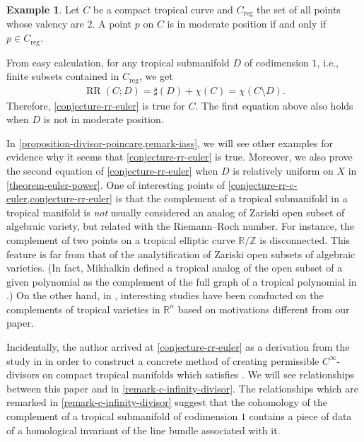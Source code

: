 \documentclass[a4paper,dvipdfmx,reqno,12pt]{amsart}
\theoremstyle{definition}
\newtheorem{example}[theorem]{Example}
\newcommand{\opn}[1]{\operatorname{#1}}
\numberwithin{equation}{section}
\begin{document}
\begin{example}
\label{example-permissible-point}
Let $C$ be a compact tropical curve 
and $C_{\mathrm{reg}}$ the set of all
points whose valency are $2$.
A point $p$ on $C$ is in moderate position
if and only if $p\in C_{\mathrm{reg}}$.

From easy calculation, for any 
tropical submanifold $D$ of codimension $1$, i.e.,
finite subsets contained in $C_{\mathrm{reg}}$, we get
\begin{align}
\opn{RR}(C;D)=\sharp (D)+ \chi(C)
=\chi(C\setminus D).
\end{align}
Therefore, \cref{conjecture-rr-euler} is true
for $C$. The first equation above also holds when
$D$ is not in moderate position.
\end{example}
In \cref{proposition-divisor-poincare,remark-iass},
we will see other examples for evidence 
why it seems that \cref{conjecture-rr-euler}
is true. Moreover, we also prove
the second equation of 
\cref{conjecture-rr-euler} when $D$ is 
relatively uniform on $X$ in
\cref{theorem-euler-power}.
One of interesting points of
\cref{conjecture-rr-c-euler,conjecture-rr-euler} is that
the complement of a tropical submanifold in
a tropical manifold is \emph{not} usually
considered an analog of Zariski open subset
of algebraic variety, but related with the
Riemann--Roch number.
For instance, the complement of two points 
on a tropical elliptic curve
$\mathbb{R}/\mathbb{Z}$ is disconnected.
This feature is far from that of the analytification of Zariski open subsets of
algebraic varieties.
(In fact, Mikhalkin defined
a tropical analog of the open subset of
a given polynomial as the complement of
the full graph \cite[]{MR2275625}
of a tropical polynomial in
\cite[Remark 3.5 and Example 3.6]{MR2275625}.)
On the other hand, in \cite{MR3498901,MR3968872}, 
interesting studies have been conducted on
the complements of tropical varieties in
$\mathbb{R}^n$ based on motivations
different from our paper.

Incidentally, the author arrived at
\cref{conjecture-rr-euler} as
a derivation from the study in
\cite{tsutsui2023graded} in order to
construct a concrete method of creating
permissible $C^{\infty}$-divisors on
compact tropical manifolds which
satisfies \cite[Conjecture 1.2]{tsutsui2023graded}. 
We will see relationships between 
this paper and \cite{tsutsui2023graded}
in \cref{remark-c-infinity-divisor}.
The relationships which are
remarked in \cref{remark-c-infinity-divisor}
suggest that the cohomology of the complement
of a tropical submanifold of codimension $1$
contains a piece of data
of a homological invariant of the line bundle
associated with it.
\end{document}

